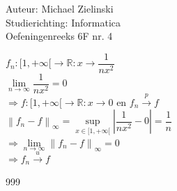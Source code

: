 \documentclass[a4paper]{article}
\begin{document}
  
\noindent \large Auteur: Michael Zielinski \\
\noindent \large Studierichting: Informatica\\
\noindent \large Oefeningenreeks 6F nr. 4\\

\medskip

\normalsize

$ f_n : [1,+\infty[ \to \mathbb{R} : x \to \dfrac{1}{n x^2} $\\

$ \lim\limits_{n \to \infty}\dfrac{1}{n x^2} = 0 $\\

$ \Rightarrow f : [1,+\infty[ \to \mathbb{R} : x \to 0 $ en $ f_n \stackrel{p}{\rightarrow} f $\\

$ \left\|f_n - f\right\|_{\infty}
  = \sup\limits_{x \in [1,+\infty[} \left|\dfrac{1}{n x^2} - 0\right|
  = \dfrac{1}{n} $\\

$ \Rightarrow \lim\limits_{n \to \infty}\left\|f_n - f\right\|_{\infty} = 0 $\\

$ \Rightarrow f_n \stackrel{u}{\rightarrow} f $\\

\begin{thebibliography}{999}
\end{thebibliography}
\end{document}
